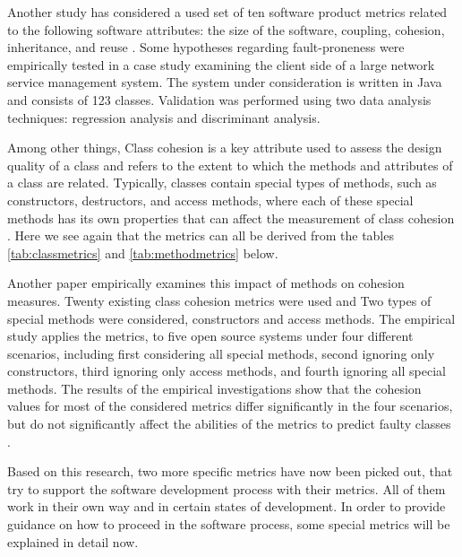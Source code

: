 Another study has considered a used set of ten software product metrics related to the following software attributes: the size of the software, coupling, cohesion, inheritance, and reuse \cite{yu2002predicting}. Some hypotheses regarding fault-proneness were empirically tested in a case study examining the client side of a large network service management system. The system under consideration is written in Java and consists of 123 classes. Validation was performed using two data analysis techniques: regression analysis and discriminant analysis.

Among other things, Class cohesion is a key attribute used to assess the design quality of a class and refers to the extent to which the methods and attributes of a class are related. Typically, classes contain special types of methods, such as constructors, destructors, and access methods, where each of these special methods has its own properties that can affect the measurement of class cohesion \cite{b4al2012impact}. Here we see again that the metrics can all be derived from the tables \ref{tab:classmetrics} and \ref{tab:methodmetrics} below.

Another paper empirically examines this impact of methods on cohesion measures. Twenty existing class cohesion metrics were used and Two types of special methods were considered, constructors and access methods. The empirical study applies the metrics, to five open source systems under four different scenarios, including first considering all special methods, second ignoring only constructors, third ignoring only access methods, and fourth ignoring all special methods.
The results of the empirical investigations show that the cohesion values for most of the considered metrics differ significantly in the four scenarios, but do not significantly affect the abilities of the metrics to predict faulty classes \cite{b4al2012impact}.

Based on this research, two more specific metrics have now been picked out, that try to support the software development process with their metrics. All of them work in their own way and in certain states of development. 
In order to provide guidance on how to proceed in the software process, some special metrics will be explained in detail now.






